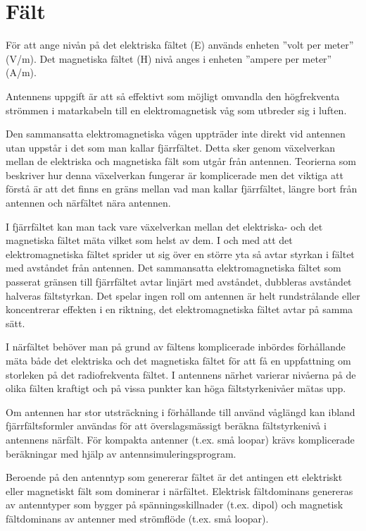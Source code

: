 \section{Fält}
För att ange nivån på det elektriska fältet (E) används enheten
''volt per meter'' (V/m).
Det magnetiska fältet (H) nivå anges i enheten ''ampere per meter'' (A/m).

Antennens uppgift är att så effektivt som möjligt omvandla den högfrekventa
strömmen i matarkabeln till en elektromagnetisk våg som utbreder sig i luften.

Den sammansatta elektromagnetiska vågen uppträder inte direkt vid antennen utan
uppstår i det som man kallar fjärrfältet.
Detta sker genom växelverkan mellan de elektriska och magnetiska fält som
utgår från antennen.
Teorierna som beskriver hur denna växelverkan fungerar är komplicerade
men det viktiga att förstå är att det finns en gräns mellan vad man
kallar fjärrfältet, längre bort från antennen och närfältet nära antennen.

I fjärrfältet kan man tack vare växelverkan mellan det elektriska- och det
magnetiska fältet mäta vilket som helst av dem.
I och med att det elektromagnetiska fältet sprider ut sig över en större yta så
avtar styrkan i fältet med avståndet från antennen.
Det sammansatta elektromagnetiska fältet som passerat gränsen till fjärrfältet
avtar linjärt med avståndet, dubbleras avståndet halveras fältstyrkan.
Det spelar ingen roll om antennen är helt rundstrålande eller koncentrerar
effekten i en riktning, det elektromagnetiska fältet avtar på samma sätt.

I närfältet behöver man på grund av fältens komplicerade inbördes förhållande
mäta både det elektriska och det magnetiska fältet för att få en uppfattning
om storleken på det radiofrekventa fältet.
I antennens närhet varierar nivåerna på de olika fälten kraftigt och på vissa
punkter kan höga fältstyrkenivåer mätas upp.

Om antennen har stor utsträckning i förhållande till använd våglängd kan ibland
fjärrfältsformler användas för att överslagsmässigt beräkna fältstyrkenivå i
antennens närfält.
För kompakta antenner (t.ex. små loopar) krävs komplicerade beräkningar
med hjälp av antennsimuleringsprogram.

Beroende på den antenntyp som genererar fältet är det antingen ett elektriskt
eller magnetiskt fält som dominerar i närfältet.
Elektrisk fältdominans genereras av antenntyper som bygger på
spänningsskillnader (t.ex. dipol) och magnetisk fältdominans av antenner
med strömflöde (t.ex. små loopar).

